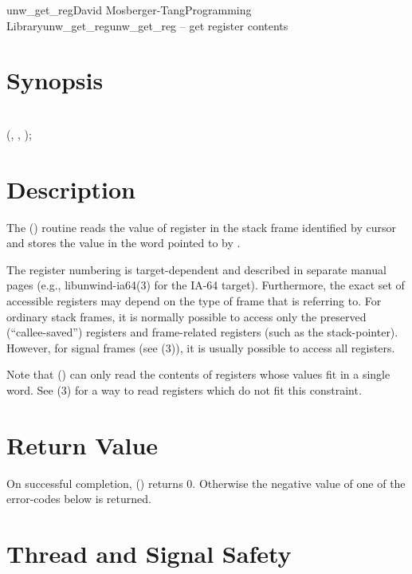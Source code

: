 \documentclass{article}
\begin{document}
\begin{Name}{3}{unw\_get\_reg}{David Mosberger-Tang}{Programming Library}{unw\_get\_reg}unw\_get\_reg -- get register contents
\end{Name}

\section{Synopsis}

\\

 (,  , );\\

\section{Description}

The () routine reads the value of register
 in the stack frame identified by cursor  and stores
the value in the word pointed to by .

The register numbering is target-dependent and described in separate
manual pages (e.g., libunwind-ia64(3) for the IA-64 target).
Furthermore, the exact set of accessible registers may depend on the
type of frame that  is referring to.  For ordinary stack
frames, it is normally possible to access only the preserved
(``callee-saved'') registers and frame-related registers (such as the
stack-pointer).  However, for signal frames (see
(3)), it is usually possible to access
all registers.

Note that () can only read the contents of
registers whose values fit in a single word.  See
(3) for a way to read registers which do not fit
this constraint.

\section{Return Value}

On successful completion, () returns 0.
Otherwise the negative value of one of the error-codes below is
returned.

\section{Thread and Signal Safety}
\end{document}
